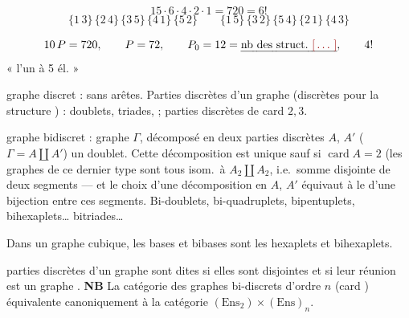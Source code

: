 \documentclass[11pt,a4paper]{article}
\begin{document}
\[
15 \cdot 6 \cdot 4 \cdot 2 \cdot 1 = 720 = 6!
\]
\[
\{1\,3\}\,\{2\,4\}\,\{3\,5\}\,\{4\,1\}\,\{5\,2\} \qquad
\{1\,5\}\,\{3\,2\}\,\{5\,4\}\,\{2\,1\}\,\{4\,3\}
\]


\[
10\,P = 720, \qquad P = 72, \qquad P_0 = 12 = \text{\uncertain{nb des struct.\ \ill{}}}, \qquad 4!
\]
« l'un à 5 él. »

graphe discret : sans arêtes. Parties discrètes d'un graphe (discrètes pour
la structure )  : doublets, triades, ; parties discrètes de card $2,3$.

 graphe \struck{\ill{}} bidiscret : graphe $\Gamma$, décomposé en deux parties discrètes
$A$, $A'$ ($\Gamma = A \amalg A'$)  
 un doublet. Cette décomposition est unique sauf si
$\operatorname{card} A = 2$  (les graphes de ce dernier type sont tous isom.\ à
$A_2 \amalg A_2$, i.e.\ somme disjointe de deux segments --- et le
choix d'une \struck{$\Delta$} décomposition  en $A$, $A'$ équivaut à le
 d'une bijection entre ces segments. Bi-doublets,
bi-quadruplets, bipentuplets, bihexaplets…
bitriades… 


Dans un graphe cubique, les bases et bibases
sont les  hexaplets et bihexaplets.

 parties discrètes d'un graphe sont dites  \struck{\ill{}}
si elles sont disjointes et si leur réunion est un \struck{\ill{}}  graphe \uncertain{(\ill{} \ill{})}.
\textbf{NB} La catégorie des graphes bi-discrets d'ordre $n$ (card
\ill{}) équivalente canoniquement à la catégorie $(\mathrm{Ens}_2) \times (\mathrm{Ens})_n$.
\end{document}
